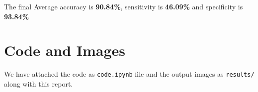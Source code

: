 \documentclass{article}
\begin{document}
The final Average accuracy is \textbf{90.84\%}, sensitivity is \textbf{46.09\%} and specificity is \textbf{93.84\%}

\section{Code and Images}
We have attached the code as \texttt{code.ipynb} file and the output images as \texttt{results/} along with this report.
\end{document}
